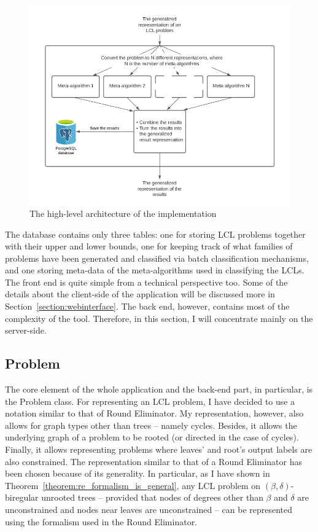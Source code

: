 \begin{figure}[ht]
  \begin{center}
    \includegraphics[width=\textwidth]{images/tool-architecture.png}
    \caption{The high-level architecture of the implementation}
    \label{fig:implementation-architecture}
  \end{center}
\end{figure}

The database contains only three tables: one for
storing LCL problems together with their upper and
lower bounds, one for keeping track of what families of
problems have been generated and classified via batch
classification mechanisms, and one storing meta-data
of the meta-algorithms used in classifying the LCLs.
The front end is quite simple from a technical perspective
too. Some of the details about the client-side of the
application will be discussed more in Section~\ref{section:webinterface}.
The back end, however, contains most of the complexity of
the tool. Therefore, in this section, I will concentrate
mainly on the server-side.

\subsection{Problem}

The core element of the whole application and the
back-end part, in particular, is the Problem class.
For representing an LCL problem, I have decided
to use a notation similar to that of Round
Eliminator. My representation, however, also
allows for graph types other than trees -- namely cycles.
Besides, it allows the underlying graph of a problem
to be rooted (or directed in the case of cycles).
Finally, it allows representing problems where
leaves' and root's output labels are also constrained.
The representation similar to that of a Round
Eliminator has been chosen because of its generality.
In particular, as I have shown in Theorem~\ref{theorem:re_formalism_is_general},
any LCL problem
on $(\beta, \delta)$-biregular unrooted trees -- provided
that nodes of degrees other than $\beta$ and $\delta$ are unconstrained
and nodes near leaves are unconstrained -- can be represented
using the formalism used in the Round Eliminator.

